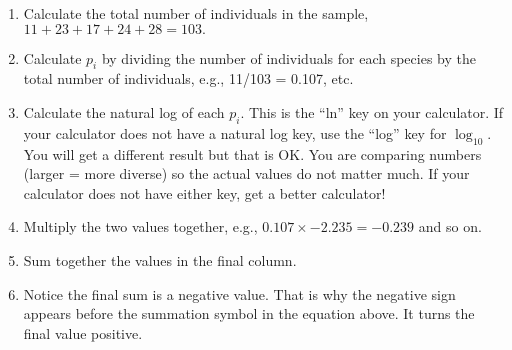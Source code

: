 \documentclass[12pt]{exam}
\begin{document}
\begin{enumerate}
\item Calculate the total number of individuals in the sample, $11 + 23 + 17 + 24 + 28 = 103.$

\item Calculate $p_i$ by dividing the number of individuals for each species by the total number of individuals, e.g., 11/103 = 0.107, etc.
%

\item Calculate the natural log of each $p_i$. This is the “ln” key on your calculator. If your calculator does not have a natural log key, use the “log” key for $\log_{10}$. You will get a different result but that is OK. You are comparing numbers (larger = more diverse) so the actual values do not matter much. If your calculator does not have either key, get a better calculator! 

%
\item Multiply the two values together, e.g., $0.107 \times -2.235 = -0.239$ and so on.


\item Sum together the values in the final column.

\item Notice the final sum is a negative value. That is why the negative sign appears before the summation symbol in the equation above. It turns the final value positive. 
\end{enumerate}
\end{document}
